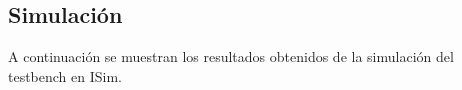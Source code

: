 \documentclass[letterpaper]{sae}
\begin{document}
\vspace{5 mm}

\newpage
\subsection{Simulación}
A continuación se muestran los resultados obtenidos de la simulación del testbench en ISim.

\begin{figure}[H] %
\label{fig:todas_test}
\end{figure}
\end{document}
